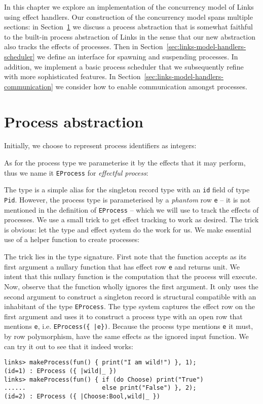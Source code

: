 \documentclass[12pt,mscres,cdtppar,twoside,openright,logo,rightchapter,normalheadings]{infthesis}
\newcommand{\snippet}[1]{}
\theoremstyle{definition}
\begin{document}
In this chapter we explore an implementation of the concurrency model
of Links using effect handlers. Our construction of the concurrency
model spans multiple sections: in
Section~\ref{sec:links-model-handlers-process} we discuss a process
abstraction that is somewhat faithful to the built-in process
abstraction of Links in the sense that our new abstraction also tracks
the effects of processes. Then in
Section~\ref{sec:links-model-handlers-scheduler} we define an
interface for spawning and suspending processes. In addition, we
implement a basic process scheduler that we subsequently refine with
more sophisticated features. In
Section~\ref{sec:links-model-handlers-communication} we consider how
to enable communication amongst processes.

\section{Process abstraction}
\label{sec:links-model-handlers-process}

Initially, we choose to represent process identifiers as integers:
%
\snippet{pidInt.links}
%
As for the process type we parameterise it by the effects that it may
perform, thus we name it \lstinline$EProcess$ for \emph{effectful
  process}:
%
\snippet{eprocess.links}
%
The type is a simple alias for the singleton record type with an
\lstinline$id$ field of type \lstinline$Pid$. However, the process
type is parameterised by a \emph{phantom} row \lstinline$e$ -- it is
not mentioned in the definition of \lstinline$EProcess$ -- which we
will use to track the effects of processes. We use a small trick to
get effect tracking to work as desired. The trick is obvious: let the
type and effect system do the work for us. We make essential use of a
helper function to create processes:
%
\snippet{makeProcess.links}
%
The trick lies in the type signature. First note that the function
accepts as its first argument a nullary function that has effect row
\lstinline$e$ and returns unit. We intent that this nullary function
is the computation that the process will execute. Now, observe that
the function wholly ignores the first argument. It only uses the
second argument to construct a singleton record is structural
compatible with an inhabitant of the type \lstinline$EProcess$. The
type system captures the effect row on the first argument and uses it
to construct a process type with an open row that mentions
\lstinline$e$, i.e. \lstinline$EProcess({ |e})$. Because the process
type mentions \lstinline$e$ it must, by row polymorphism, have the
same effects as the ignored input function. We can try it out to see
that it indeed works:
%
\begin{lstlisting}
links> makeProcess(fun() { print("I am wild!") }, 1);
(id=1) : EProcess ({ |wild|_ })
links> makeProcess(fun() { if (do Choose) print("True") 
......                     else print("False") }, 2);
(id=2) : EProcess ({ |Choose:Bool,wild|_ })
\end{lstlisting}
%
\end{document}
